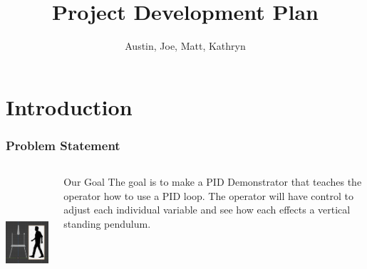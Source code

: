 \documentclass[aspectratio=169]{beamer}
\title{Project Development Plan}       %
\author{Austin, Joe, Matt, Kathryn}                     %
\institute{SNHU/CETA}                                   %
\begin{document}
\frame{\titlepage} %

\section{Introduction}
\begin{frame}
    \frametitle{Problem Statement}

    \begin{columns}

    \begin{column}{0.4\textwidth}
        \includegraphics[height=5cm]{Scale}
    \end{column}

    \begin{column}{0.58\textwidth}
        \begin{block}{Our Goal}
        The goal is to make a PID Demonstrator that teaches the operator how to use a PID loop.
        The operator will have control to adjust each individual variable and see how each effects a
        vertical standing pendulum.
    \end{block}
    \end{column}
\end{columns}


\end{frame}
\end{document}

